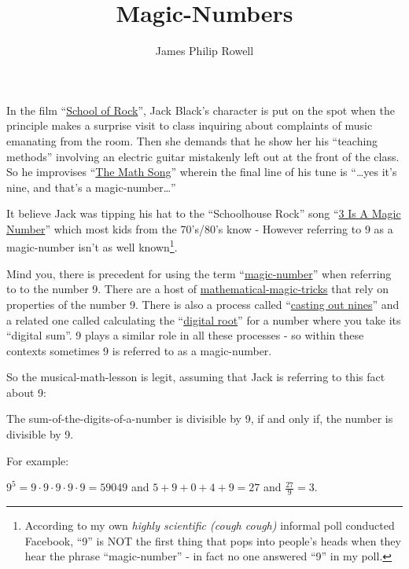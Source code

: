 \documentclass{article}
\title{Magic-Numbers}
\author{James Philip Rowell}
\date{} %
\newenvironment{jprIn}{\begin{adjustwidth}{2em}{}}{\end{adjustwidth}}
\begin{document}
\maketitle

In the film ``\href{https://en.wikipedia.org/wiki/School_of_Rock}{School
of Rock}'', Jack Black's character is put on the spot when
the principle makes a surprise visit to class
inquiring about complaints of music emanating from the room. Then she demands that he show
her his ``teaching methods'' involving an electric guitar mistakenly
left out at the front of the class.
So he improvises ``\href{https://www.youtube.com/watch?v=aa8U0nL-KXg}{The
Math Song}'' wherein the final line of his
tune is ``\dots{}yes it's nine, and that's a magic-number\dots{}''

It believe Jack was tipping his hat
to the ``Schoolhouse Rock'' song ``\href{https://youtu.be/aU4pyiB-kq0}{3
Is A Magic Number}''
which most kids from the 70's/80's know -
However referring to 9 as a magic-number isn't
as well known\footnote{According to my own \emph{highly scientific (cough cough)}
informal poll conducted Facebook, %
``9'' is NOT the first thing that pops into people's heads when they
hear the phrase ``magic-number'' - in fact no one answered ``9'' in my poll.}.

Mind you, there is precedent
for using the term ``\href{http://mathworld.wolfram.com/MagicNumber.html}{magic-number}''
when referring to to the number 9.
There are a host of
\href{http://mathematics-in-europe.eu/?p=144}{mathematical-magic-tricks}
that rely on properties of the number 9.
There is also a process called
``\href{https://en.wikipedia.org/wiki/Casting_out_nines}{casting out nines}'' and a related one 
called calculating the
``\href{http://mathworld.wolfram.com/DigitalRoot.html}{digital root}''
for a number where you take its ``digital sum''. 9 plays a similar role
in all these processes - so within these contexts sometimes 9
is referred to as a magic-number.

So the musical-math-lesson is legit, assuming that Jack is referring to this fact about 9:
\begin{center}
The sum-of-the-digits-of-a-number is divisible by 9,
\break
if and only if,
\break
the number
is divisible by 9.
\end{center}

For example:
\begin{jprIn}
$9^5=9\cdot{}9\cdot{}9\cdot{}9\cdot{}9=59049$
\quad and \quad $5+9+0+4+9=27$ \quad and \quad $\frac{27}{9} = 3$.
\end{jprIn}
\end{document}
